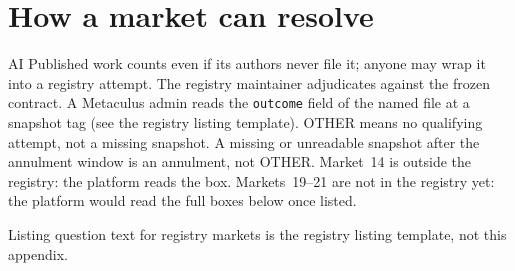 \section{How a market can resolve}
\label{sec:appp-resolution-interface}
\begin{authbar}{AI}
Published work counts even if its authors never file it; anyone may wrap it into a registry attempt.
The registry maintainer adjudicates against the frozen contract.
A Metaculus admin reads the \texttt{outcome} field of the named file at a snapshot tag (see the registry listing template).
OTHER means no qualifying attempt, not a missing snapshot.
A missing or unreadable snapshot after the annulment window is an annulment, not OTHER.
Market~14 is outside the registry: the platform reads the box.
Markets~19--21 are not in the registry yet: the platform would read the full boxes below once listed.

Listing question text for registry markets is the registry listing template, not this appendix.

\end{authbar}
\authbarneedspace

